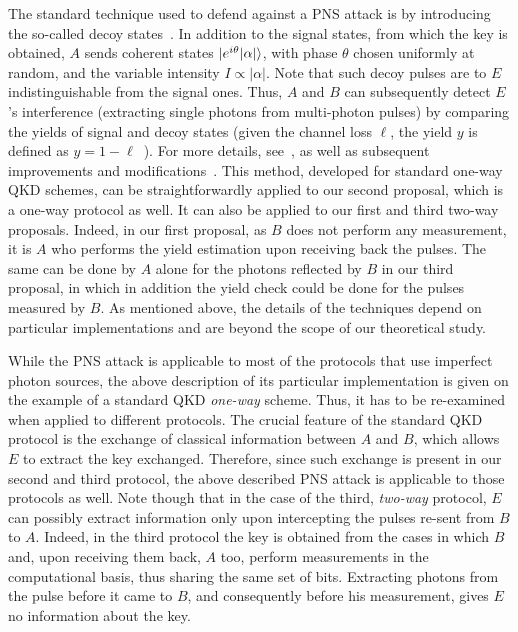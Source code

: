 The standard technique used to defend against a PNS attack is by introducing the so-called decoy states~\cite{hwa:03}. In addition to the signal states, from which the key is obtained, $A$ sends coherent states $| e^{i\theta}|\alpha| \rangle$, with phase $\theta$ chosen uniformly at random, and the variable intensity $I\propto |\alpha|$. Note that such decoy pulses are to $E$ indistinguishable from the signal ones. Thus, $A$ and $B$ can subsequently detect $E$'s interference (extracting single photons from multi-photon pulses) by comparing the yields of signal and decoy states (given the channel loss $\ell$, the yield $y$ is defined as $y=1-\ell$~\cite{hwa:03}). For more details, see~\cite{lo:ma:che:05}, as well as subsequent improvements and modifications~\cite{wan:05a,wan:05b,har:ett:hug:nor:05,ma:qi:zha:lo:05,wan:wan:bjo:kar:07,ros:pet:har:ric:dal:tya:mcc:nam:bae:had:hug:nor:09,luc:dyn:fro:yua:shi:15}. This method, developed for standard one-way QKD schemes, can be straightforwardly applied to our second proposal, which is a one-way protocol as well. It can also be applied to our first and third two-way proposals. Indeed, in our first proposal, as $B$ does not perform any measurement, it is $A$ who performs the yield estimation upon receiving back the pulses. The same can be done by $A$ alone for the photons reflected by $B$ in our third proposal, in which in addition the yield check could be done for the pulses measured by $B$. As mentioned above, the details of the techniques depend on particular implementations and are beyond the scope of our theoretical study.

While the PNS attack is applicable to most of the protocols that use imperfect photon sources, the above description of its particular implementation is given on the example of a standard QKD {\em one-way} scheme. Thus, it has to be re-examined when applied to different protocols. The crucial feature of the standard QKD protocol is the exchange of classical information between $A$ and $B$, which allows $E$ to extract the key exchanged. Therefore, since such exchange is present in our second and third protocol, the above described PNS attack is applicable to those protocols as well. Note though that in the case of the third, {\em two-way} protocol, $E$ can possibly extract information only upon intercepting the pulses re-sent from $B$ to $A$. Indeed, in the third protocol the key is obtained from the cases in which $B$ and, upon receiving them back, $A$ too, perform measurements in the computational basis, thus sharing the same set of bits. Extracting photons from the pulse before it came to $B$, and consequently before his measurement, gives $E$ no information about the key.

